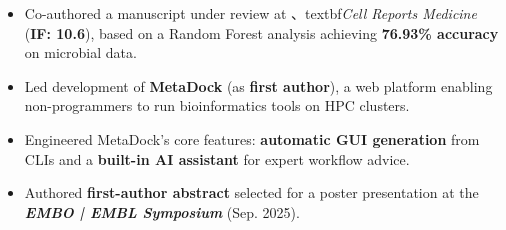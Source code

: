 \documentclass{resume}
\begin{document}
\begin{itemize}
    \item Co-authored a manuscript under review at 、textbf{\textit{Cell Reports Medicine}} (\textbf{IF: 10.6}), based on a Random Forest analysis achieving \textbf{76.93\% accuracy} on microbial data.
    \item Led development of \textbf{MetaDock} (as \textbf{first author}), a web platform enabling non-programmers to run bioinformatics tools on HPC clusters.
    \item Engineered MetaDock's core features: \textbf{automatic GUI generation} from CLIs and a \textbf{built-in AI assistant} for expert workflow advice.
    \item Authored \textbf{first-author abstract} selected for a poster presentation at the \textbf{\textit{EMBO | EMBL Symposium}} (Sep. 2025).
\end{itemize}


\end{document}
